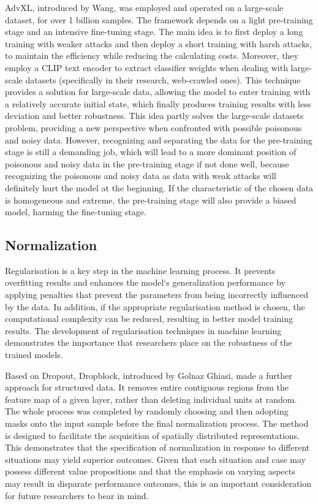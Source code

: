 \documentclass{article}
\begin{document}
AdvXL\cite{wang2024revisitingadversarialtrainingscale}, introduced by Wang, was employed and operated on a large-scale dataset, for over 1 billion samples. The framework depends on a light pre-training stage and an intensive fine-tuning stage. The main idea is to first deploy a long training with weaker attacks and then deploy a short training with harsh attacks, to maintain the efficiency while reducing the calculating costs. Moreover, they employ a CLIP text encoder to extract classifier weights when dealing with large-scale datasets (specifically in their research, web-crawled ones). This technique provides a solution for large-scale data, allowing the model to enter training with a relatively accurate initial state, which finally produces training results with less deviation and better robustness. This idea partly solves the large-scale datasets problem, providing a new perspective when confronted with possible poisonous and noisy data. However, recognizing and separating the data for the pre-training stage is still a demanding job, which will lead to a more dominant position of poisonous and noisy data in the pre-training stage if not done well, because recognizing the poisonous and noisy data as data with weak attacks will definitely hurt the model at the beginning. If the characteristic of the chosen data is homogeneous and extreme,  the pre-training stage will also provide a biased model, harming the fine-tuning stage.


\subsection{Normalization}

Regularisation is a key step in the machine learning process. It prevents overfitting results and enhances the model‘s generalization performance by applying penalties that prevent the parameters from being incorrectly influenced by the data. In addition, if the appropriate regularisation method is chosen, the computational complexity can be reduced, resulting in better model training results. The development of regularisation techniques in machine learning demonstrates the importance that researchers place on the robustness of the trained models.

Based on Dropout, Dropblock\cite{ghiasi2018dropblockregularizationmethodconvolutional}, introduced by Golnaz Ghiasi, made a further approach for structured data. It removes entire contiguous regions from the feature map of a given layer, rather than deleting individual units at random. The whole process was completed by randomly choosing and then adopting masks onto the input sample before the final normalization process. The method is designed to facilitate the acquisition of spatially distributed representations.  This demonstrates that the specification of normalization in response to different situations may yield superior outcomes. Given that each situation and case may possess different value propositions and that the emphasis on varying aspects may result in disparate performance outcomes, this is an important consideration for future researchers to bear in mind.
\end{document}
